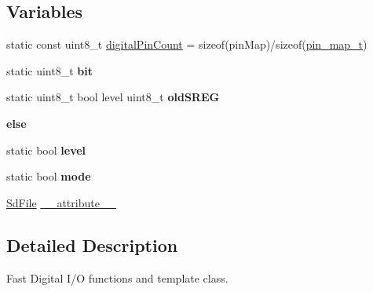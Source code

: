 \subsection*{Variables}
\begin{DoxyCompactItemize}
\item 
static const uint8\-\_\-t \hyperlink{group__digital_pin_ga3ba5f4d8ff10e60ec2d424722dd9fe92}{digital\-Pin\-Count} = sizeof(pin\-Map)/sizeof(\hyperlink{structpin__map__t}{pin\-\_\-map\-\_\-t})
\item 
\hypertarget{group__digital_pin_gad15e9d6879273cee61ab5b915db182a7}{static uint8\-\_\-t {\bfseries bit}}\label{group__digital_pin_gad15e9d6879273cee61ab5b915db182a7}

\item 
\hypertarget{group__digital_pin_ga3146654bb267c84258ec880e7971e7d4}{static uint8\-\_\-t bool level uint8\-\_\-t {\bfseries old\-S\-R\-E\-G}}\label{group__digital_pin_ga3146654bb267c84258ec880e7971e7d4}

\item 
{\bfseries else}
\item 
static bool {\bfseries level}
\item 
static bool {\bfseries mode}
\item 
\hyperlink{class_sd_file}{Sd\-File} \hyperlink{group__digital_pin_ga12ab6a6fc3dc79da4f7f0b2b7b066379}{\-\_\-\-\_\-attribute\-\_\-\-\_\-}
\end{DoxyCompactItemize}


\subsection{Detailed Description}
Fast Digital I/\-O functions and template class. 


